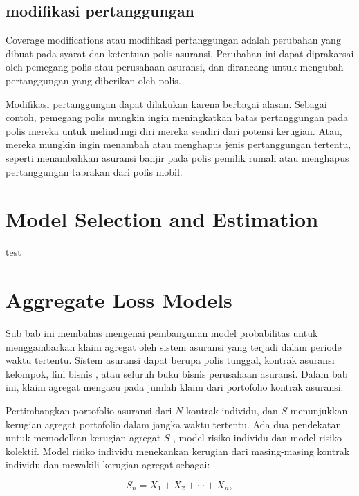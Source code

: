 \documentclass[
]{book}
\begin{document}
\hypertarget{modifikasi-pertanggungan}{%
\section{modifikasi pertanggungan}\label{modifikasi-pertanggungan}}

Coverage modifications atau modifikasi pertanggungan adalah perubahan yang dibuat pada syarat dan ketentuan polis asuransi. Perubahan ini dapat diprakarsai oleh pemegang polis atau perusahaan asuransi, dan dirancang untuk mengubah pertanggungan yang diberikan oleh polis.

Modifikasi pertanggungan dapat dilakukan karena berbagai alasan. Sebagai contoh, pemegang polis mungkin ingin meningkatkan batas pertanggungan pada polis mereka untuk melindungi diri mereka sendiri dari potensi kerugian. Atau, mereka mungkin ingin menambah atau menghapus jenis pertanggungan tertentu, seperti menambahkan asuransi banjir pada polis pemilik rumah atau menghapus pertanggungan tabrakan dari polis mobil.

\hypertarget{model-selection-and-estimation}{%
\chapter{Model Selection and Estimation}\label{model-selection-and-estimation}}

test

\hypertarget{aggregate-loss-models}{%
\chapter{Aggregate Loss Models}\label{aggregate-loss-models}}

Sub bab ini membahas mengenai pembangunan model probabilitas untuk menggambarkan klaim agregat oleh sistem asuransi yang terjadi dalam periode waktu tertentu. Sistem asuransi dapat berupa polis tunggal, kontrak asuransi kelompok, lini bisnis , atau seluruh buku bisnis perusahaan asuransi. Dalam bab ini, klaim agregat mengacu pada jumlah klaim dari portofolio kontrak asuransi.

Pertimbangkan portofolio asuransi dari \(N\) kontrak individu, dan \(S\) menunjukkan kerugian agregat portofolio dalam jangka waktu tertentu. Ada dua pendekatan untuk memodelkan kerugian agregat \(S\) , model risiko individu dan model risiko kolektif. Model risiko individu menekankan kerugian dari masing-masing kontrak individu dan mewakili kerugian agregat sebagai:

\[S_n=X_1 +X_2 +\cdots+X_n,\]
\end{document}
